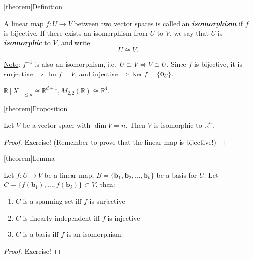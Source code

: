 \documentclass[12pt]{report}
\theoremstyle{definition}
\begin{document}
[theorem]{Definition}
\begin{isomorphism}
    A linear map $f:U\rightarrow{}V$ between two vector spaces is called an \textbf{\emph{isomorphism}}
    if $f$ is bijective.
    If there exists an isomorphism from $U$ to $V$,
    we say that $U$ is \textbf{\emph{isomorphic}} to $V$, and write\[
        U \cong V.
    \]
\end{isomorphism}

\underline{Note}: $f^{-1}$ is also an isomorphism, i.e.\ $U \cong V \iff V \cong U$.
Since $f$ is bijective, it is surjective $\Rightarrow{}$ Im $f = V$,
and injective $\Rightarrow{} \ker{f} = \{\mathbf{0}_U\}$.

\begin{ex}
    $\mathbb{R}{[X]}_{\le d} \cong \mathbb{R}^{d+1}, M_{2, 2}(\mathbb{R}) \cong \mathbb{R}^{4}$.
\end{ex}

[theorem]{Proposition}
\begin{isomorphic to Rn}
    Let $V$ be a vector space with $\dim{V} = n$.
    Then $V$ is isomorphic to $\mathbb{R}^{n}$.
\end{isomorphic to Rn}

\begin{proof}
    Exercise! (Remember to prove that the linear map is bijective!)
\end{proof}

[theorem]{Lemma}
\begin{C is basis iif f is isomorphism}
    Let $f:U\rightarrow{}V$ be a linear map, $B=\{\mathbf{b}_1, \mathbf{b}_2,\ldots,\mathbf{b}_k\}$
    be a basis for $U$. Let $C = \{f(\mathbf{b}_1),\ldots,f(\mathbf{b}_k)\} \subset V$, then:
    \begin{enumerate}[label = (\roman*)]
        \item $C$ is a spanning set iff $f$ is surjective
        \item $C$ is linearly independent iff $f$ is injective
        \item $C$ is a basis iff $f$ is an isomorphism.
    \end{enumerate}
\end{C is basis iif f is isomorphism}

\begin{proof}
    Exercise!
\end{proof}
\end{document}
